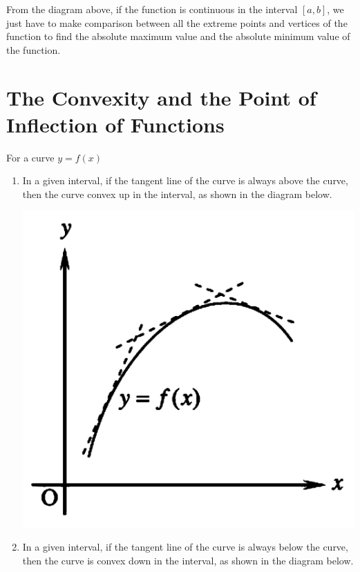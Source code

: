 From the diagram above, if the function is continuous in the interval $[a, b]$,
we just have to make comparison between all the extreme points and vertices of
the function to find the absolute maximum value and the absolute minimum value
of the function.




\section{The Convexity and the Point of Inflection of Functions}

For a curve $y = f(x)$
\begin{enumerate}
    \item In a given interval, if the tangent line of the curve is always above the
          curve, then the curve convex up in the interval, as shown in the diagram below.
          \begin{center}
              \includegraphics[scale=0.25]{assets/26-12.png}
          \end{center}
    \item In a given interval, if the tangent line of the curve is always below the
          curve, then the curve is convex down in the interval, as shown in the diagram
          below.
          \begin{center}

\end{center}
\end{enumerate}
